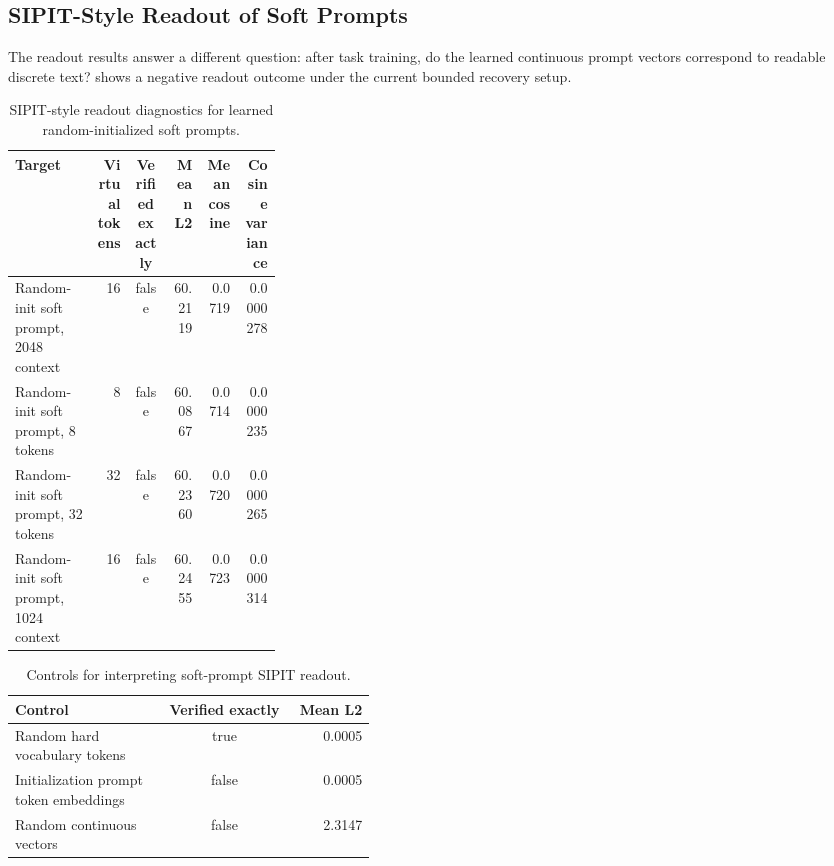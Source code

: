 \documentclass[12pt,a4paper,twoside,openright]{book}
\begin{document}
\subsection{SIPIT-Style Readout of Soft Prompts}
\label{subsec:results-soft-prompt-readout}

The readout results answer a different question: after task training, do the
learned continuous prompt vectors correspond to readable discrete text?
 shows a negative readout outcome under
the current bounded recovery setup.

\begin{table}[!htb]
    \centering
    \scriptsize
    \begin{adjustbox}{width=\textwidth}
    \begin{tabular}{p{0.31\linewidth} r c r r r}
        \toprule
        \textbf{Target} & \textbf{Virtual tokens} & \textbf{Verified exactly} & \textbf{Mean L2} & \textbf{Mean cosine} & \textbf{Cosine variance} \\
        \midrule
        Random-init soft prompt, 2048 context &
        16 & false & 60.2119 & 0.0719 & 0.0000278 \\
        Random-init soft prompt, 8 tokens &
        8 & false & 60.0867 & 0.0714 & 0.0000235 \\
        Random-init soft prompt, 32 tokens &
        32 & false & 60.2360 & 0.0720 & 0.0000265 \\
        Random-init soft prompt, 1024 context &
        16 & false & 60.2455 & 0.0723 & 0.0000314 \\
        \bottomrule
    \end{tabular}
    \end{adjustbox}
    \caption{SIPIT-style readout diagnostics for learned random-initialized soft
    prompts.}
    \label{tab:soft-prompt-sipit-readout}
\end{table}

\begin{table}[!htb]
    \centering
    \scriptsize
    \begin{adjustbox}{width=\textwidth}
    \begin{tabular}{p{0.42\linewidth} c r}
        \toprule
        \textbf{Control} & \textbf{Verified exactly} & \textbf{Mean L2} \\
        \midrule
        Random hard vocabulary tokens &
        true & 0.0005 \\
        Initialization prompt token embeddings &
        false & 0.0005 \\
        Random continuous vectors &
        false & 2.3147 \\
        \bottomrule
    \end{tabular}
    \end{adjustbox}
    \caption{Controls for interpreting soft-prompt SIPIT readout.}
    \label{tab:soft-prompt-sipit-controls}
\end{table}
\end{document}
